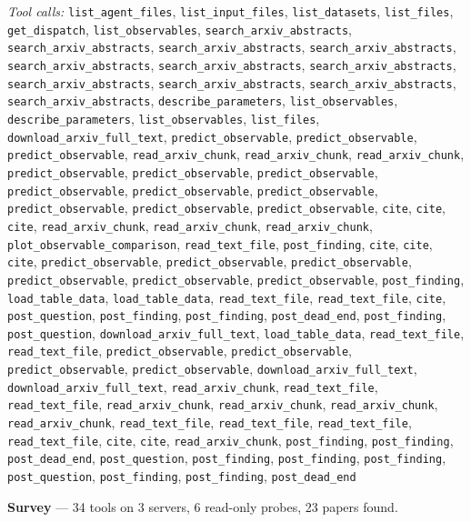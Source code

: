 \documentclass[11pt,a4paper]{article}
\begin{document}
\textit{Tool calls:} \texttt{list\_agent\_files}, \texttt{list\_input\_files}, \texttt{list\_datasets}, \texttt{list\_files}, \texttt{get\_dispatch}, \texttt{list\_observables}, \texttt{search\_arxiv\_abstracts}, \texttt{search\_arxiv\_abstracts}, \texttt{search\_arxiv\_abstracts}, \texttt{search\_arxiv\_abstracts}, \texttt{search\_arxiv\_abstracts}, \texttt{search\_arxiv\_abstracts}, \texttt{search\_arxiv\_abstracts}, \texttt{search\_arxiv\_abstracts}, \texttt{search\_arxiv\_abstracts}, \texttt{search\_arxiv\_abstracts}, \texttt{search\_arxiv\_abstracts}, \texttt{describe\_parameters}, \texttt{list\_observables}, \texttt{describe\_parameters}, \texttt{list\_observables}, \texttt{list\_files}, \texttt{download\_arxiv\_full\_text}, \texttt{predict\_observable}, \texttt{predict\_observable}, \texttt{predict\_observable}, \texttt{read\_arxiv\_chunk}, \texttt{read\_arxiv\_chunk}, \texttt{read\_arxiv\_chunk}, \texttt{predict\_observable}, \texttt{predict\_observable}, \texttt{predict\_observable}, \texttt{predict\_observable}, \texttt{predict\_observable}, \texttt{predict\_observable}, \texttt{predict\_observable}, \texttt{predict\_observable}, \texttt{predict\_observable}, \texttt{cite}, \texttt{cite}, \texttt{cite}, \texttt{read\_arxiv\_chunk}, \texttt{read\_arxiv\_chunk}, \texttt{read\_arxiv\_chunk}, \texttt{plot\_observable\_comparison}, \texttt{read\_text\_file}, \texttt{post\_finding}, \texttt{cite}, \texttt{cite}, \texttt{cite}, \texttt{predict\_observable}, \texttt{predict\_observable}, \texttt{predict\_observable}, \texttt{predict\_observable}, \texttt{predict\_observable}, \texttt{predict\_observable}, \texttt{post\_finding}, \texttt{load\_table\_data}, \texttt{load\_table\_data}, \texttt{read\_text\_file}, \texttt{read\_text\_file}, \texttt{cite}, \texttt{post\_question}, \texttt{post\_finding}, \texttt{post\_finding}, \texttt{post\_dead\_end}, \texttt{post\_finding}, \texttt{post\_question}, \texttt{download\_arxiv\_full\_text}, \texttt{load\_table\_data}, \texttt{read\_text\_file}, \texttt{read\_text\_file}, \texttt{predict\_observable}, \texttt{predict\_observable}, \texttt{predict\_observable}, \texttt{predict\_observable}, \texttt{download\_arxiv\_full\_text}, \texttt{download\_arxiv\_full\_text}, \texttt{read\_arxiv\_chunk}, \texttt{read\_text\_file}, \texttt{read\_text\_file}, \texttt{read\_arxiv\_chunk}, \texttt{read\_arxiv\_chunk}, \texttt{read\_arxiv\_chunk}, \texttt{read\_arxiv\_chunk}, \texttt{read\_text\_file}, \texttt{read\_text\_file}, \texttt{read\_text\_file}, \texttt{read\_text\_file}, \texttt{cite}, \texttt{cite}, \texttt{read\_arxiv\_chunk}, \texttt{post\_finding}, \texttt{post\_finding}, \texttt{post\_dead\_end}, \texttt{post\_question}, \texttt{post\_finding}, \texttt{post\_finding}, \texttt{post\_finding}, \texttt{post\_question}, \texttt{post\_finding}, \texttt{post\_finding}, \texttt{post\_dead\_end}\par
\textbf{Survey} --- 34 tools on 3 servers, 6 read-only probes, 23 papers found.
\end{document}
